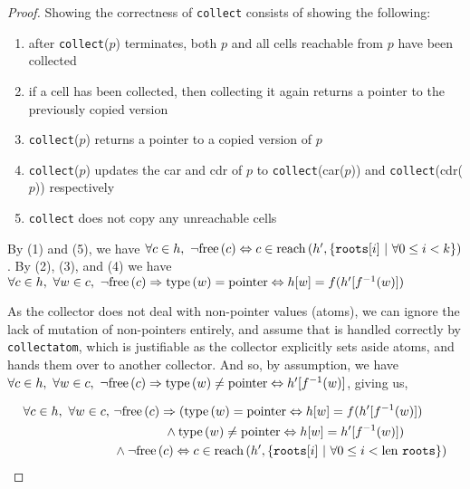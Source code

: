 \begin{proof}
  Showing the correctness of \texttt{collect} consists of showing the
  following:

  \begin{enumerate}
  \item after \texttt{collect}($p$) terminates, both $p$ and all cells
    reachable from $p$ have been collected

  \item if a cell has been collected, then collecting it again returns
    a pointer to the previously copied version

  \item \texttt{collect}($p$) returns a pointer to a copied version of
    $p$

  \item \texttt{collect}($p$) updates the car and cdr of $p$ to
    \texttt{collect}(car($p$)) and \texttt{collect}(cdr($p$))
    respectively

  \item \texttt{collect} does not copy any unreachable cells
  \end{enumerate}

  By (1) and (5), we have $\forall c \in h,\ \lnot\free{c} \iff c \in
  \reach{h'}{\{\mathtt{roots}[i]~|~\forall 0 \leq i < k\}}$. By (2),
  (3), and (4) we have $\forall c \in h,\ \forall w \in c,\ \lnot\mathrm{free}\left(c\right)
  \Rightarrow \mathrm{type}\left(w\right) = \mathrm{pointer} \Leftrightarrow h[w] =
  f(h'[f^{-1}(w)])$

  As the collector does not deal with non-pointer values (atoms), we
  can ignore the lack of mutation of non-pointers entirely, and assume
  that is handled correctly by \texttt{collectatom}, which is
  justifiable as the collector explicitly sets aside atoms, and hands
  them over to another collector. And so, by assumption, we have
  $\forall c \in h,\ \forall w \in c,\ \lnot\mathrm{free}\left(c\right) \Rightarrow
  \mathrm{type}\left(w\right) \neq \mathrm{pointer} \Leftrightarrow h'[f^{-1}(w)]$, giving
  us,

  \begin{align*}
    \forall c \in h,\ \forall w \in c,\ &\lnot\mathrm{free}\left(c\right) \Rightarrow
    (\mathrm{type}\left(w\right) = \mathrm{pointer} \Leftrightarrow h[w] = f(h'[f^{-1}(w)])\\
    &\quad\quad\quad\quad \land \mathrm{type}\left(w\right) \neq \mathrm{pointer}
    \Leftrightarrow h[w] = h'[f^{-1}(w)])\\
    &\land \lnot\mathrm{free}\left(c\right) \Leftrightarrow c \in \mathrm{reach}\left(h', \{\mathtt{roots}[i]~|~\forall
      0 \leq i < \mathrm{len}~\mathtt{roots}\}\right)
  \end{align*}
\end{proof}

